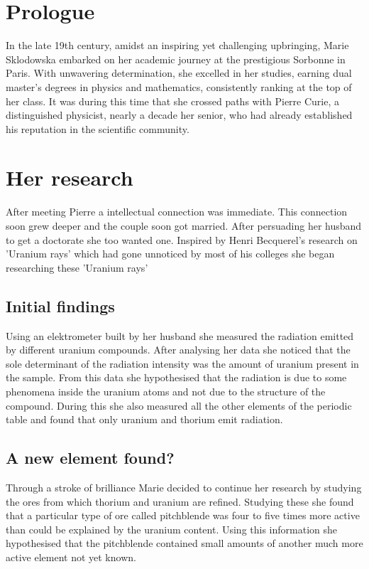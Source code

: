 \documentclass[12pt]{article}
\begin{document}
\tableofcontents
\pagebreak
\section{Prologue}

In the late 19th century, amidst an inspiring yet challenging upbringing, Marie Sklodowska embarked on her academic journey at the prestigious Sorbonne in Paris. With unwavering determination, she excelled in her studies, earning dual master's degrees in physics and mathematics, consistently ranking at the top of her class. It was during this time that she crossed paths with Pierre Curie, a distinguished physicist, nearly a decade her senior, who had already established his reputation in the scientific community.

\section{Her research}

After meeting Pierre a intellectual connection was immediate. This connection soon grew deeper and the couple soon got married. After persuading her husband to get a doctorate she too wanted one. Inspired by Henri Becquerel's research on 'Uranium rays' which had gone unnoticed by most of his colleges she began researching these 'Uranium rays'

\subsection{Initial findings}
Using an elektrometer built by her husband she measured the radiation emitted by different uranium compounds. After analysing her data she noticed that the sole determinant of the radiation intensity was the amount of uranium present in the sample. From this data she hypothesised that the radiation is due to some phenomena inside the uranium atoms and not due to the structure of the compound. During this she also measured all the other elements of the periodic table and found that only uranium and thorium emit radiation. 

\subsection{A new element found?}
Through a stroke of brilliance Marie decided to continue her research by studying the ores from which thorium and uranium are refined. Studying these she found that a particular type of ore called pitchblende was four to five times more active than could be explained by the uranium content. Using this information she hypothesised that the pitchblende contained small amounts of another much more active element not yet known. 
\end{document}
